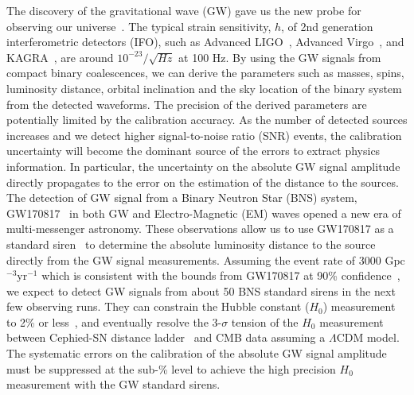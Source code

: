 \documentclass[A4]{spie}  %
\begin{document}
The discovery of the gravitational wave (GW) gave us the new probe for observing our universe~\cite{PhysRevLett.116.061102}. 
The typical strain sensitivity, $h$, of 2nd generation interferometric detectors (IFO), such as Advanced LIGO~\cite{0264-9381-32-7-074001}, Advanced Virgo~\cite{0264-9381-32-2-024001}, and KAGRA~\cite{0264-9381-29-12-124007, PhysRevD.88.043007}, are around $10^{-23}/\sqrt{Hz}$ at 100 Hz. 
By using the GW signals from compact binary coalescences, we can derive 
the parameters such as masses, spins, luminosity distance, orbital inclination 
and the sky location of the binary system from the detected waveforms. 
The precision of the derived parameters are potentially limited by the 
calibration accuracy. As the number of detected sources increases and we 
detect higher signal-to-noise ratio (SNR) events, the calibration uncertainty 
will become the dominant source of the errors to extract physics information. 
In particular, the uncertainty on the absolute GW signal amplitude directly 
propagates to the error on the estimation of the distance to the sources. 
The detection of GW signal from a Binary Neutron Star (BNS) system, 
GW170817~\cite{GW170817:2017aa} in both GW and Electro-Magnetic (EM) 
waves opened a new era of multi-messenger astronomy. These observations 
allow us to use GW170817 as a standard 
siren~\cite{Abbott:2017xzu,Schutz_1986,Holz_2005,Nissanke_2010} to 
determine the absolute luminosity distance to the source directly from the 
GW signal measurements. Assuming the event rate of 3000 Gpc$^{-3}$yr$^{-1}$ 
which is consistent with the bounds from GW170817 at 90\% 
confidence~\cite{GW170817:2017aa}, we expect to detect GW signals from about 
50 BNS standard sirens in the next few observing runs. 
They can constrain the Hubble constant ($H_0$) 
measurement to 2\% or less~\cite{Feeney:2018mkj}, and eventually resolve 
the 3-$\sigma$ tension of the $H_0$ measurement between Cephied-SN distance 
ladder~\cite{Riess_2016} and CMB data assuming a $\Lambda$CDM 
model.~\cite{2016-planck} The systematic errors on the calibration of 
the absolute GW signal amplitude must be suppressed at the sub-\% level to 
achieve the high precision $H_0$ measurement with the GW standard sirens.

\end{document}
